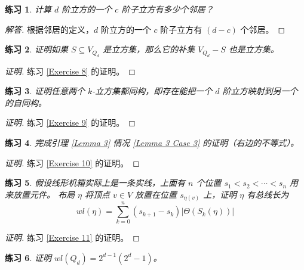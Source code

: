 \documentclass[12pt, a4paper]{article}
\newtheorem{exercisewithanswer}{练习}
\newenvironment{answer}[1][Answer]{
	\begin{proof}[#1]
	\let\qed\relax
}{
	\end{proof}
}
\begin{document}
\begin{exercisewithanswer}
计算 $d$ 阶立方的一个 $c$ 阶子立方有多少个邻居？
\end{exercisewithanswer}

\begin{answer}[解答]
根据邻居的定义，$d$ 阶立方的一个 $c$ 阶子立方有 $(d - c)$ 个邻居。
\end{answer}

\begin{exercisewithanswer}
证明如果 $S \subseteq V_{Q_d}$ 是立方集，那么它的补集 $V_{Q_d} − S$ 也是立方集。
\end{exercisewithanswer}

\begin{proof}[证明]
练习 \ref{Exercise 8} 的证明。
\end{proof}

\begin{exercisewithanswer}
证明任意两个 $k$-立方集都同构，即存在能把一个 $d$ 阶立方映射到另一个的自同构。
\end{exercisewithanswer}

\begin{proof}[证明]
练习 \ref{Exercise 9} 的证明。
\end{proof}

\begin{exercisewithanswer}
完成引理 \ref{Lemma 3} 情况 \ref{Lemma 3 Case 3} 的证明（右边的不等式）。
\end{exercisewithanswer}

\begin{proof}[证明]
练习 \ref{Exercise 10} 的证明。
\end{proof}

\begin{exercisewithanswer}
假设线形机箱实际上是一条实线，上面有 $n$ 个位置 $s_1 < s_2 < \cdots < s_n$ 用来放置元件。
布局 $\eta$ 将顶点 $v \in V$ 放置在位置 $s_{\eta(v)}$ 上，证明 $\eta$ 有总线长为
\begin{equation*}
wl(\eta) = \sum_{k = 0}^n (s_{k + 1} - s_k) |\Theta(S_k(\eta))|
\end{equation*}
\end{exercisewithanswer}

\begin{proof}[证明]
练习 \ref{Exercise 11} 的证明。
\end{proof}

\begin{exercisewithanswer}
证明 $wl(Q_d) = 2^{d - 1} (2^d - 1)$。
\end{exercisewithanswer}
\end{document}
